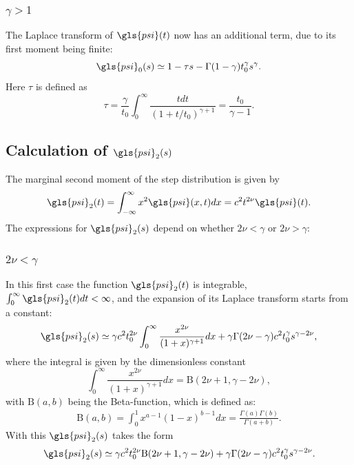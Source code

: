 \subsubsection*{$ \gamma>1$}
The Laplace transform of $\gls{psi}(t)$ now has an additional term, due to its first moment being finite:
\begin{equation}
\gls{psi}_{0}(s) \simeq 1 - \tau s - \Gamma(1-\gamma ) t_0^\gamma s^\gamma.
\label{eqn:psi0GammaBig}
\end{equation}  
Here $\tau$ is defined as 
\begin{equation}
 \tau = \frac{\gamma}{t_0} \int_0^\infty \frac{t dt}{(1+t/t_0)^{\gamma +1}} = 
 \frac{t_0}{\gamma-1} . \label{eq:tau}
\end{equation}

\subsection*{Calculation of $\gls{psi}_2(s)$}
The marginal second moment of the step distribution is given by  
\begin{align}
 \gls{psi}_2(t) = \int_{-\infty}^\infty x^2 \gls{psi}(x,t) dx = c^2 t^{2 \nu} \gls{psi}(t).
\end{align}
The expressions for $\gls{psi}_2(s)$ depend on whether $2 \nu < \gamma $ or $2 \nu > \gamma$:

\subsubsection*{$2\nu<\gamma$} 
In this first case the function $\gls{psi}_2(t)$ is integrable, $\int_0^\infty \gls{psi}_2(t) dt < \infty$, and the expansion 
of its Laplace transform starts from a constant:
\begin{equation}
 \gls{psi}_2(s) \simeq \gamma c^2 t_0^{2\nu}  \int_0^\infty \frac{x^{2\nu}}{(1+x)^{\gamma+1}} dx  + \gamma \Gamma(2\nu-\gamma) c^2t_0^\gamma s^{\gamma-2\nu} ,
\end{equation}
where the integral is given by the dimensionless constant 
\begin{equation}
 \int_0^\infty \frac{x^{2\nu}}{(1+x)^{\gamma+1}} dx = \mathrm{B}(2\nu+1,\gamma-2\nu), \label{eqn:I1}
\end{equation}
with $\mathrm{B}(a,b)$ being the Beta-function, which is defined as:
%
\begin{align}
\mathrm{B}(a,b) = \int_{0}^{1} x^{a-1}(1-x)^{b-1} dx = \frac{\Gamma(a)\Gamma(b)}{\Gamma(a+b)} .
\end{align}
%
With this $\gls{psi}_2(s)$ takes the form 
%
\begin{align}
\gls{psi}_2(s) \simeq \gamma c^2 t_0^{2\nu}  \mathrm{B}(2\nu+1,\gamma-2\nu)  + \gamma \Gamma(2\nu-\gamma) c^2t_0^\gamma s^{\gamma-2\nu} \label{eqn:psi2NuSmall} .
\end{align}

